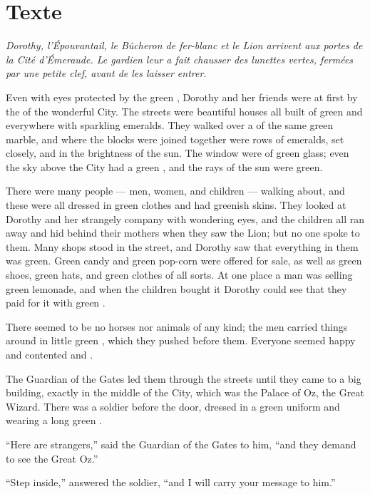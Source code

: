 \documentclass[troisieme]{fiche}
\begin{document}
\section{Texte}

\noindent\small\textit{Dorothy, l'Épouvantail, le Bûcheron de fer-blanc et le Lion arrivent aux
portes de la Cité d'Émeraude. Le gardien leur a fait chausser des lunettes vertes, fermées par
une petite clef, avant de les laisser entrer.}\normalsize

\begin{texte}
Even with eyes protected by the green , Dorothy and
her friends were at first  by the
 of the wonderful City. The streets were
 beautiful houses all built of green
 and  everywhere with
sparkling emeralds. They walked over a  of
the same green marble, and where the blocks were joined together were rows of emeralds, set
closely, and  in the brightness of the sun. The window
 were of green glass; even the sky above the City had a green
, and the rays of the sun were green.

There were many people --- men, women, and children --- walking about, and these were all
dressed in green clothes and had greenish skins. They looked at Dorothy and her strangely
 company with wondering eyes, and the children all
ran away and hid behind their mothers when they saw the Lion; but no one spoke to them. Many
shops stood in the street, and Dorothy saw that everything in them was green. Green candy and
green pop-corn were offered for sale, as well as green shoes, green hats, and green clothes of
all sorts. At one place a man was selling green lemonade, and when the children bought it
Dorothy could see that they paid for it with green .

There seemed to be no horses nor animals of any kind; the men carried things around in little
green , which they pushed before them. Everyone seemed happy
and contented and .

The Guardian of the Gates led them through the streets until they came to a big building,
exactly in the middle of the City, which was the Palace of Oz, the Great Wizard. There was a
soldier before the door, dressed in a green uniform and wearing a long green
.

``Here are strangers,'' said the Guardian of the Gates to him, ``and they demand to see the
Great Oz.''

``Step inside,'' answered the soldier, ``and I will carry your message to him.''
\end{texte}
\end{document}
